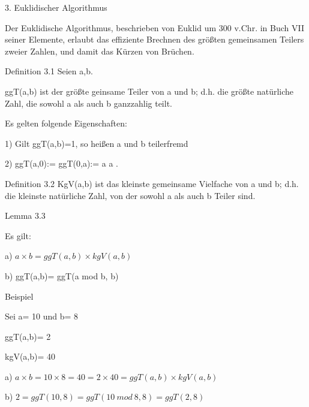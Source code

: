 \documentclass[10pt]{beamer}
\begin{document}
\begin{frame}{3. Euklidischer Algorithmus}

Der Euklidische Algorithmus, beschrieben von Euklid um 300 v.Chr. in Buch VII seiner Elemente, erlaubt das effiziente Brechnen des größten gemeinsamen Teilers zweier Zahlen, und damit das Kürzen von Brüchen.
    
\end{frame}

\begin{frame}{Definition 3.1}
    Seien a,b\in {}. 

\noindent ggT(a,b) ist der größte geinsame Teiler von a und b; d.h. die größte natürliche Zahl, die sowohl a als auch b ganzzahlig teilt. 

Es gelten folgende Eigenschaften:

1) Gilt ggT(a,b)=1, so heißen a und b teilerfremd

2) ggT(a,0):= ggT(0,a):= a  \forall a \in {}.
\end{frame}

\begin{frame}{Definition 3.2}
 KgV(a,b) ist das kleinste gemeinsame Vielfache von a und b; d.h. die kleinste natürliche Zahl, von der sowohl a als auch b Teiler sind.
    
\end{frame}

\begin{frame}{Lemma 3.3}

Es gilt: 

\vspace{0.3cm}
a) $a\times b = ggT(a,b) \times kgV(a,b)$


\noindent b) ggT(a,b)= ggT(a mod b, b)

\end{frame}

\begin{frame}{Beispiel}

Sei a= 10 und b= 8

ggT(a,b)= 2

kgV(a,b)= 40

\vspace{0,5cm}

a) $a \times b= 10 \times 8= 40= 2\times 40 = ggT(a,b) \times kgV(a,b)$

b) $2= ggT(10,8) = ggT (10 \ mod \ 8,8) = ggT(2,8)$
    
\end{frame}
\end{document}
